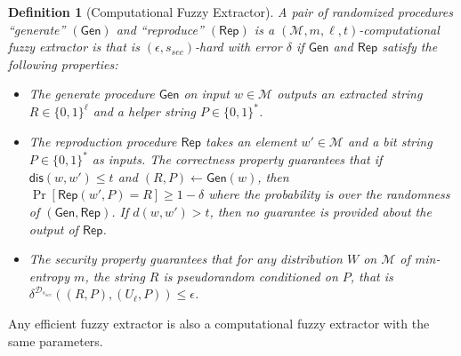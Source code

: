 \documentclass[11pt]{article}
\newcommand{\secref}[1]{\mbox{Section~\ref{#1}}}
\newcommand{\class}[1]{{\ensuremath{\mathsf{#1}}}}
\newcommand{\gen}{\ensuremath{\class{Gen}}\xspace}
\newcommand{\rep}{\ensuremath{\class{Rep}}\xspace}
\newcommand{\rec}{\ensuremath{\class{Rec}}\xspace}
\newcommand{\dis}{\ensuremath{\mathsf{dis}}}
\newtheorem{definition}[theorem]{Definition}
\newcommand{\authnote}[2]{{\textcolor{red}{\textsf{#1 notes: }\textcolor{blue}{ #2}}\marginpar{\textcolor{red}{\textbf{!!!!!}}}}}
\newcommand{\authnote}[2]{}
\newcommand{\bnote}[1]{{\authnote{Ben}{#1}}}
\begin{document}
\begin{definition}[Computational Fuzzy Extractor]\label{def:comp fuzzy extractor}
A pair of randomized procedures ``generate'' $(\gen)$ and ``reproduce'' $(\rep)$ is a $(\mathcal{M}, m, \ell, t)$-\emph{computational fuzzy extractor} is that is $(\epsilon, s_{sec})$-hard with error $\delta$ if \gen and \rep satisfy the following properties:
\begin{itemize}
\item The generate procedure \gen on input $w\in \mathcal{M}$ outputs an extracted string $R\in\{0,1\}^\ell$ and a helper string $P\in\{0,1\}^*$.
\item The reproduction procedure \rep takes an element $w'\in\mathcal{M}$ and a bit string $P\in\{0,1\}^*$ as inputs.  The \emph{correctness} property guarantees that if $\dis(w, w')\leq t$ and $(R, P)\leftarrow \gen(w)$, then $\Pr[\rep( w', P) = R] \geq 1-\delta$ where the probability is over the randomness of $(\gen, \rep)$.  %
If $d(w, w') > t$, then no guarantee is provided about the output of \rep.
\item The \emph{security} property guarantees that for any distribution $W$ on $\mathcal{M}$ of min-entropy $m$, the string $R$ is pseudorandom conditioned on $P$, that is $\delta^{\mathcal{D}_{s_{sec}}}((R, P), (U_\ell, P))\leq \epsilon$.
\end{itemize}
\end{definition}
Any efficient fuzzy extractor is also a computational fuzzy extractor with the same parameters.%


\end{document}
